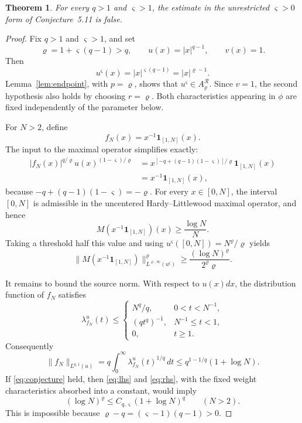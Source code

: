 \documentclass[11pt]{article}
\newtheorem{theorem}{Theorem}
\newcommand{\AR}{A^{\mathcal R}}
\begin{document}
\begin{theorem}\label{thm:counterexample}
For every $q>1$ and $\varsigma>1$, the estimate in the unrestricted
$\varsigma>0$ form of Conjecture~5.11 is false.
\end{theorem}

\begin{proof}
Fix $q>1$ and $\varsigma>1$, and set
\[
 \varrho=1+\varsigma(q-1)>q,
 \qquad u(x)=|x|^{q-1},\qquad v(x)=1.
\]
Then
\[
 u^\varsigma(x)=|x|^{\varsigma(q-1)}=|x|^{\varrho-1}.
\]
Lemma~\ref{lem:endpoint}, with $p=\varrho$, shows that
$u^\varsigma\in\AR_{\varrho}$.  Since $v=1$, the second hypothesis also
holds by choosing $r=\varrho$.  Both characteristics appearing in $\phi$
are fixed independently of the parameter below.

For $N>2$, define
\[
 f_N(x)=x^{-1}\mathbf1_{[1,N]}(x).
\]
The input to the maximal operator simplifies exactly:
\begin{align*}
 |f_N(x)|^{q/\varrho}u(x)^{(1-\varsigma)/\varrho}
 &=x^{[-q+(q-1)(1-\varsigma)]/\varrho}\mathbf1_{[1,N]}(x)\\
 &=x^{-1}\mathbf1_{[1,N]}(x),
\end{align*}
because $-q+(q-1)(1-\varsigma)=-\varrho$.
For every $x\in[0,N]$, the interval $[0,N]$ is admissible in the uncentered
Hardy--Littlewood maximal operator, and hence
\[
 M(x^{-1}\mathbf1_{[1,N]})(x)\geq\frac{\log N}{N}.
\]
Taking a threshold half this value and using
$u^\varsigma([0,N])=N^\varrho/\varrho$ yields
\begin{equation}\label{eq:lhs}
 \bigl\|M(x^{-1}\mathbf1_{[1,N]})\bigr\|^
 {\varrho}_{L^{\varrho,\infty}(u^\varsigma)}
 \geq \frac{(\log N)^\varrho}{2^\varrho\varrho}.
\end{equation}

It remains to bound the source norm.  With respect to $u(x)dx$, the
distribution function of $f_N$ satisfies
\[
 \lambda_{f_N}^u(t)\leq
 \begin{cases}
 N^q/q,&0<t<N^{-1},\\
 (qt^q)^{-1},&N^{-1}\leq t<1,\\
 0,&t\geq1.
 \end{cases}
\]
Consequently
\begin{equation}\label{eq:rhs}
 \|f_N\|_{L^{q,1}(u)}
 =q\int_0^\infty\lambda_{f_N}^u(t)^{1/q}\,dt
 \leq q^{1-1/q}(1+\log N).
\end{equation}
If \eqref{eq:conjecture} held, then \eqref{eq:lhs} and
\eqref{eq:rhs}, with the fixed weight characteristics absorbed into a
constant, would imply
\[
 (\log N)^\varrho\leq C_{q,\varsigma}(1+\log N)^q
 \qquad(N>2).
\]
This is impossible because
$\varrho-q=(\varsigma-1)(q-1)>0$.
\end{proof}
\end{document}
